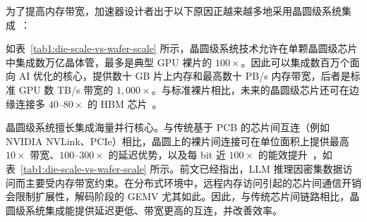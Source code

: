 \begin{table}[t]
    \vspace{-2mm}
\caption{裸片级系统与晶圆级系统的比较}
    \vspace{-3mm}
\label{tab1:die-scale-vs-wafer-scale}
\end{table}

为了提高内存带宽，加速器设计者出于以下原因正越来越多地采用晶圆级系统集成~\cite{tsmc-advanced-packaging}：

 如表~\ref{tab1:die-scale-vs-wafer-scale} 所示，晶圆级系统技术允许在单颗晶圆级芯片中集成数万亿晶体管，最多是典型 GPU 裸片的 $100\times$。因此可以集成数百万个面向 AI 优化的核心，提供数十 GB 片上内存和最高数十 PB/s 内存带宽，后者是标准 GPU 数 TB/s 带宽的 $1{,}000\times$。与标准裸片相比，未来的晶圆级芯片还可在边缘连接多 $40$--$80\times$ 的 HBM 芯片~\cite{tsmc-advanced-packaging}。

 晶圆级系统擅长集成海量并行核心。与传统基于 PCB 的芯片间互连（例如 NVIDIA NVLink、PCIe）相比，晶圆上的裸片间连接可在单位面积上提供最高 $10\times$ 带宽、$100$--$300\times$ 的延迟优势，以及每 bit 近 $100\times$ 的能效提升~\cite{wse}，如表~\ref{tab1:die-scale-vs-wafer-scale} 所示。前文已经指出，LLM 推理因密集数据访问而主要受内存带宽约束。在分布式环境中，远程内存访问引起的芯片间通信开销会限制扩展性，解码阶段的 GEMV 尤其如此。因此，与传统芯片间链路相比，晶圆级系统集成能提供延迟更低、带宽更高的互连，并改善效率。


